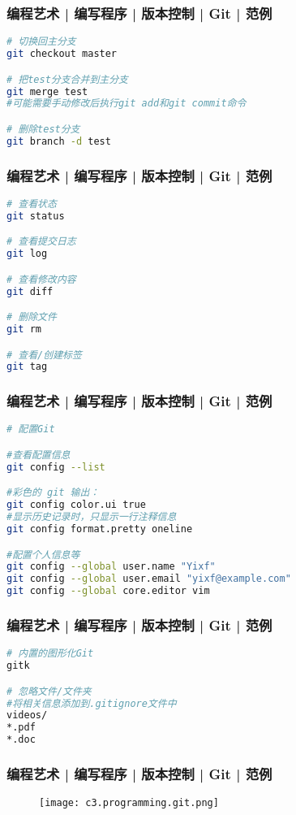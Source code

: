 \begin{frame}[fragile]
  \frametitle{编程艺术 | 编写程序 | 版本控制 | Git | 范例}
\begin{lstlisting}[language=sh]
# 切换回主分支
git checkout master

# 把test分支合并到主分支
git merge test
#可能需要手动修改后执行git add和git commit命令

# 删除test分支
git branch -d test
\end{lstlisting}
\end{frame}

\begin{frame}[fragile]
  \frametitle{编程艺术 | 编写程序 | 版本控制 | Git | 范例}
\begin{lstlisting}[language=sh]
# 查看状态
git status

# 查看提交日志
git log

# 查看修改内容
git diff

# 删除文件
git rm

# 查看/创建标签
git tag
\end{lstlisting}
\end{frame}

\begin{frame}[fragile]
  \frametitle{编程艺术 | 编写程序 | 版本控制 | Git | 范例}
\begin{lstlisting}[language=sh]
# 配置Git

#查看配置信息
git config --list

#彩色的 git 输出：
git config color.ui true
#显示历史记录时，只显示一行注释信息
git config format.pretty oneline

#配置个人信息等
git config --global user.name "Yixf"
git config --global user.email "yixf@example.com"
git config --global core.editor vim
\end{lstlisting}
\end{frame}

\begin{frame}[fragile]
  \frametitle{编程艺术 | 编写程序 | 版本控制 | Git | 范例}
\begin{lstlisting}[language=sh]
# 内置的图形化Git
gitk

# 忽略文件/文件夹
#将相关信息添加到.gitignore文件中
videos/
*.pdf
*.doc
\end{lstlisting}
\end{frame}

\begin{frame}
  \frametitle{编程艺术 | 编写程序 | 版本控制 | Git | \alert{范例}}
  \begin{figure}
    \centering
    \texttt{[image: c3.programming.git.png]}
  \end{figure}
\end{frame}

